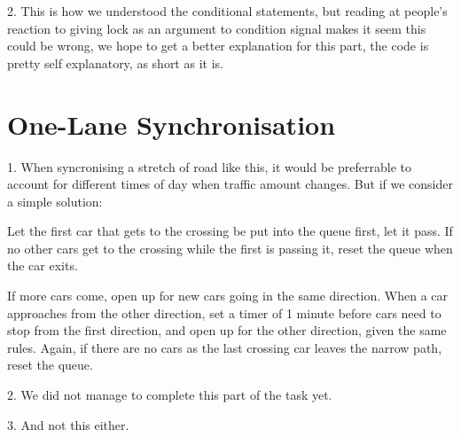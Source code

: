 \vspace{1pc}

2. This is how we understood the conditional statements, but reading
at people's reaction to giving lock as an argument to condition signal
makes it seem this could be wrong, we hope to get a better explanation
for this part, the code is pretty self explanatory, as short as it is.


\section{One-Lane Synchronisation}

1. When syncronising a stretch of road like this, it would be
preferrable to account for different times of day when traffic amount
changes. But if we consider a simple solution:

Let the first car that gets to the crossing be put into the queue
first, let it pass. If no other cars get to the crossing while the
first is passing it, reset the queue when the car exits.

If more cars come, open up for new cars going in the same
direction. When a car approaches from the other direction, set a timer
of 1 minute before cars need to stop from the first direction, and
open up for the other direction, given the same rules. Again, if there
are no cars as the last crossing car leaves the narrow path, reset the
queue.

2. We did not manage to complete this part of the task yet.

3. And not this either.




%



